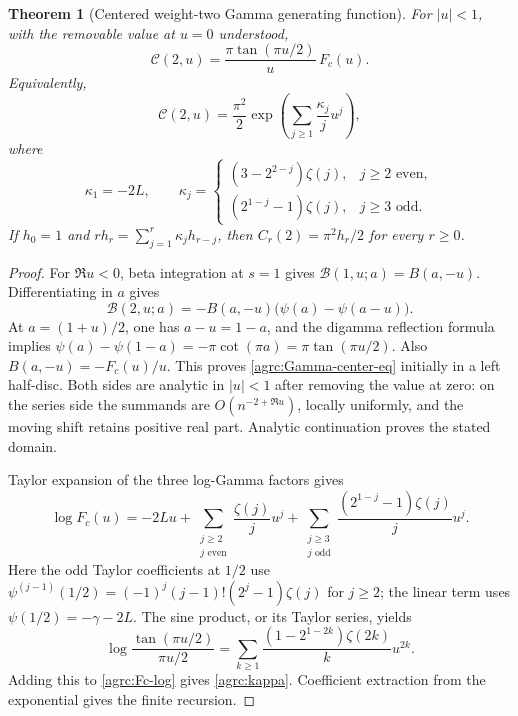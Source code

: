 \documentclass[11pt]{article}
\numberwithin{equation}{section}
\newtheorem{theorem}{Theorem}[section]
\theoremstyle{definition}\newtheorem{definition}[theorem]{Definition}
\theoremstyle{remark}\newtheorem{remark}[theorem]{Remark}
\newcommand{\Bcal}{\mathcal B}
\newcommand{\Ccal}{\mathcal C}
\begin{document}
\begin{theorem}[Centered weight-two Gamma generating function]
\label{agrc:Gamma-center}
For $|u|<1$, with the removable value at $u=0$ understood,
\begin{equation}\label{agrc:Gamma-center-eq}
 \boxed{\displaystyle
 \Ccal(2,u)=\frac{\pi\tan(\pi u/2)}{u}\,F_c(u).}
\end{equation}
Equivalently,
\begin{equation}\label{agrc:cumulant-gen}
 \Ccal(2,u)=\frac{\pi^2}{2}
       \exp\left(\sum_{j\geq1}\frac{\kappa_j}{j}u^j\right),
\end{equation}
where
\begin{equation}\label{agrc:kappa}
 \kappa_1=-2L,\qquad
 \kappa_j=
 \begin{cases}
 (3-2^{2-j})\zeta(j),&j\geq2\text{ even},\\
 (2^{1-j}-1)\zeta(j),&j\geq3\text{ odd}.
 \end{cases}
\end{equation}
If $h_0=1$ and $rh_r=\sum_{j=1}^r\kappa_jh_{r-j}$, then
$C_r(2)=\pi^2h_r/2$ for every $r\geq0$.
\end{theorem}
\begin{proof}
For $\Re u<0$, beta integration at $s=1$ gives
$\Bcal(1,u;a)=B(a,-u)$. Differentiating in $a$ gives
\[
 \Bcal(2,u;a)=-B(a,-u)\bigl(\psi(a)-\psi(a-u)\bigr).
\]
At $a=(1+u)/2$, one has $a-u=1-a$, and the digamma reflection formula
implies
$\psi(a)-\psi(1-a)=-\pi\cot(\pi a)=\pi\tan(\pi u/2)$.
Also $B(a,-u)=-F_c(u)/u$. This proves
\eqref{agrc:Gamma-center-eq} initially in a left half-disc. Both sides
are analytic in $|u|<1$ after removing the value at zero: on the series
side the summands are $O(n^{-2+\Re u})$, locally uniformly, and the
moving shift retains positive real part. Analytic continuation proves
the stated domain.

Taylor expansion of the three log-Gamma factors gives
\begin{equation}\label{agrc:Fc-log}
 \log F_c(u)=-2Lu+
 \sum_{\substack{j\geq2\\j\text{ even}}}\frac{\zeta(j)}j u^j
 +\sum_{\substack{j\geq3\\j\text{ odd}}}
          \frac{(2^{1-j}-1)\zeta(j)}j u^j.
\end{equation}
Here the odd Taylor coefficients at $1/2$ use
$\psi^{(j-1)}(1/2)=(-1)^j(j-1)!(2^j-1)\zeta(j)$ for $j\geq2$;
the linear term uses $\psi(1/2)=-\gamma-2L$.
The sine product, or its Taylor series, yields
\[
 \log\frac{\tan(\pi u/2)}{\pi u/2}
 =\sum_{k\geq1}\frac{(1-2^{1-2k})\zeta(2k)}k u^{2k}.
\]
Adding this to \eqref{agrc:Fc-log} gives \eqref{agrc:kappa}.
Coefficient extraction from the exponential gives the finite recursion.
\end{proof}
\end{document}
